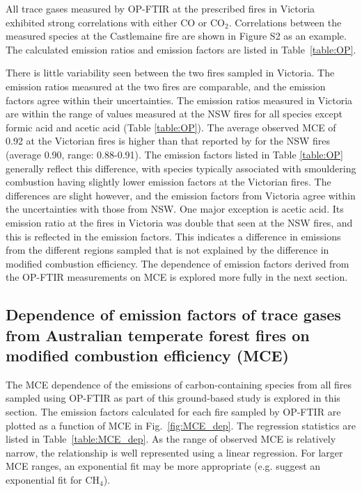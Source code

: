 \documentclass[acp, manuscript]{copernicus}
\begin{document}
All trace gases measured by OP-FTIR at the prescribed fires in Victoria exhibited strong correlations with either CO or CO$_2$. Correlations between the measured species at the Castlemaine fire are shown in Figure S2 as an example. The calculated emission ratios and emission factors are listed in Table~\ref{table:OP}. %

There is little variability seen between the two fires sampled in Victoria. The emission ratios measured at the two fires are comparable, and the emission factors agree within their uncertainties. The emission ratios measured in Victoria are within the range of values measured at the NSW fires for all species except formic acid and acetic acid (Table \ref{table:OP}).  
The average observed MCE of 0.92 at the Victorian fires is higher than that reported by \citet{Paton-Walsh2014} for the NSW fires (average 0.90, range: 0.88-0.91). The emission factors listed in Table \ref{table:OP} generally reflect this difference, with species typically associated with smouldering combustion having slightly lower emission factors at the Victorian fires. The differences are slight however, and the emission factors from Victoria agree within the uncertainties with those from NSW. One major exception is acetic acid. Its emission ratio at the fires in Victoria was double that seen at the NSW fires, and this is reflected in the emission factors. This indicates a difference in emissions from the different regions sampled that is not explained by the difference in modified combustion efficiency. The dependence of emission factors derived from the OP-FTIR measurements on MCE is explored more fully in the next section.  


\subsection{Dependence of emission factors of trace gases from Australian temperate forest fires on modified combustion efficiency (MCE)}

The MCE dependence of the emissions of carbon-containing species from all fires sampled using OP-FTIR as part of this ground-based study is explored in this section. The emission factors calculated for each fire sampled by OP-FTIR are plotted as a function of MCE in Fig.~\ref{fig:MCE_dep}. The regression statistics are listed in Table~\ref{table:MCE_dep}. As the range of observed MCE is relatively narrow, the relationship is well represented using a linear regression. For larger MCE ranges, an exponential fit may be more appropriate (e.g. \citet{Meyer2012} suggest an exponential fit for CH$_4$). 
\end{document}
